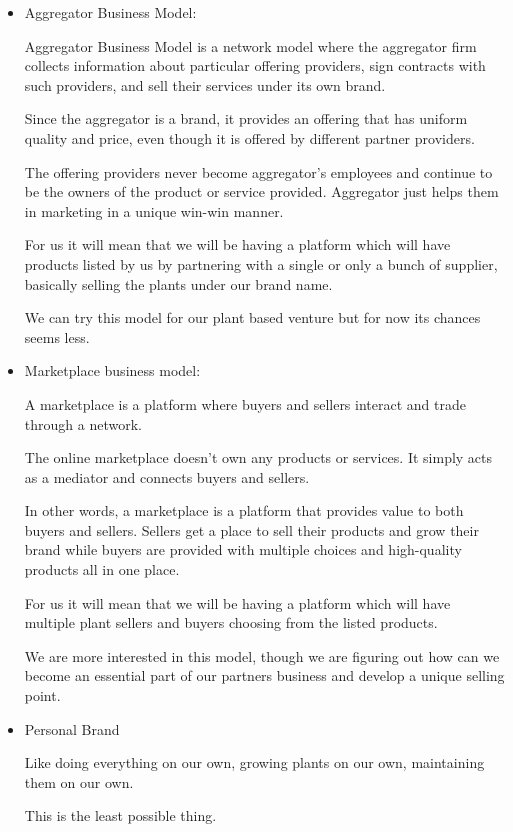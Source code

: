 \documentclass{article}
\begin{document}
\begin{itemize}

\item Aggregator Business Model:

Aggregator Business Model is a network model where the aggregator firm collects information about particular offering providers, sign contracts with such providers, and sell their services under its own brand.

Since the aggregator is a brand, it provides an offering that has uniform quality and price, even though it is offered by different partner providers.

The offering providers never become aggregator’s employees and continue to be the owners of the product or service provided. Aggregator just helps them in marketing in a unique win-win manner.

For us it will mean that we will be having a platform which will have products listed by us by partnering with a single or only a bunch of supplier, basically selling the plants under our brand name.

We can try this model for our plant based venture but for now its chances seems less.

\item Marketplace business model:

A marketplace is a platform where buyers and sellers interact and trade through a network.

The online marketplace doesn’t own any products or services. It simply acts as a mediator and connects buyers and sellers.

In other words, a marketplace is a platform that provides value to both buyers and sellers. Sellers get a place to sell their products and grow their brand while buyers are provided with multiple choices and high-quality products all in one place.

For us it will mean that we will be having a platform which will have multiple plant sellers and buyers choosing from the listed products.

We are more interested in this model, though we are figuring out how can we become an essential part of our partners business and develop a unique selling point.

\item Personal Brand

Like doing everything on our own, growing plants on our own, maintaining them on our own. 

This is the least possible thing.

\end{itemize}
\end{document}
